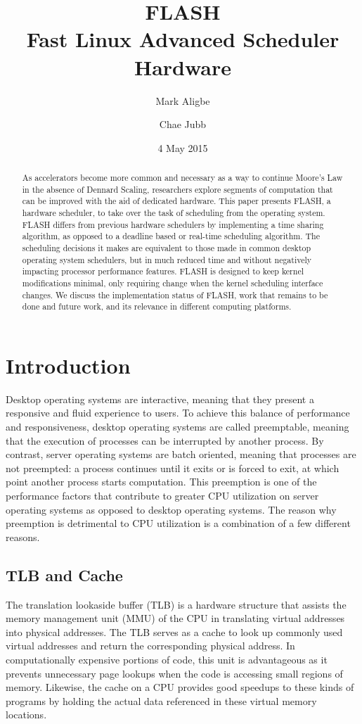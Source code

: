 \documentclass{sig-alternate-10pt}
\title{FLASH\\Fast Linux Advanced Scheduler Hardware}
\author{
	Mark Aligbe \\
	    \email{ma2799@columbia.edu}
	\and
    Chae Jubb \\
        \email{ecj2122@columbia.edu}
}
\date{4 May 2015}
\begin{document}
\maketitle

\begin{abstract}
As accelerators become more common and necessary as a way to continue
Moore's Law in the absence of Dennard Scaling, researchers explore segments
of computation that can be improved with the aid of dedicated hardware. This
paper presents FLASH, a hardware scheduler, to take over the task of
scheduling from the operating system. FLASH differs from previous hardware
schedulers by implementing a time sharing algorithm, as opposed to
a deadline based or real-time scheduling algorithm. The scheduling decisions
it makes are equivalent to those made in common desktop operating system
schedulers, but in much reduced time and without negatively impacting
processor performance features. FLASH is designed to keep kernel
modifications minimal, only requiring change when the kernel scheduling
interface changes. We discuss the implementation status of FLASH,
work that remains to be done and future work, and its relevance in different computing
platforms.

\end{abstract}


\section{Introduction}
\label{sec:intro}
Desktop operating systems are interactive, meaning that they present
a responsive and fluid experience to users. To achieve this balance of
performance and responsiveness, desktop operating systems are called
preemptable, meaning that the execution of processes can be interrupted by
another process. By contrast, server operating systems are batch oriented,
meaning that processes are not preempted: a process continues until it exits
or is forced to exit, at which point another process starts computation.
This preemption is one of the performance factors that contribute to greater
CPU utilization on server operating systems as opposed to desktop operating
systems. The reason why preemption is detrimental to CPU utilization is
a combination of a few different reasons.

\subsection{TLB and Cache}
The translation lookaside buffer (TLB) is a hardware structure that assists
the memory management unit (MMU) of the CPU in translating virtual addresses
into physical addresses. The TLB serves as a cache to look up commonly used
virtual addresses and return the corresponding physical address. In
computationally expensive portions of code, this unit is advantageous as it
prevents unnecessary page lookups when the code is accessing small regions
of memory. Likewise, the cache on a CPU provides good speedups to these
kinds of programs by holding the actual data referenced in these virtual
memory locations.
\end{document}

